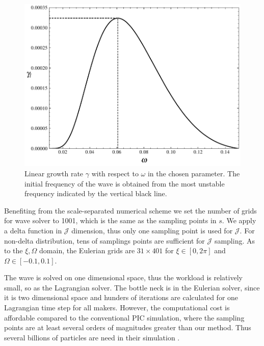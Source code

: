 \begin{figure}[htbp]
    \centering
    \includegraphics[scale=0.5]{cpc_img/fig_gamma1d.pdf}
    \caption{Linear growth rate $\gamma$ with respect to $\omega$ in the chosen parameter. The initial frequency of the wave is obtained from the most unstable frequency indicated by the vertical black line.}
    \label{fig.para}
\end{figure}

Benefiting from the scale-separated numerical scheme we set the number of grids for wave solver to 1001, which is the same as the sampling points in $s$. 
We apply a delta function in $\mathcal{J}$ dimension, thus only one sampling point is used for $\mathcal{J}$.
For non-delta distribution, tens of samplings points are sufficient for $\mathcal{J}$ sampling. 
As to the $\xi,\Omega$ domain, the Eulerian grids are $31 \times 401$ for $\xi \in [0,2\pi]$ and $\Omega \in [-0.1,0.1]$.

The wave is solved on one dimensional space, thus the workload is relatively small, so as the Lagrangian solver.
The bottle neck is in the Eulerian solver, since it is two dimensional space and hunders of iterations are calculated for one Lagrangian time step for all makers.
However, the computational cost is affordable compared to the conventional PIC simulation, where the sampling points are at least several orders of magnitudes  greater than our method. 
Thus several billions of particles are need in their simulation \cite{nogi2022,katoh2016}.

